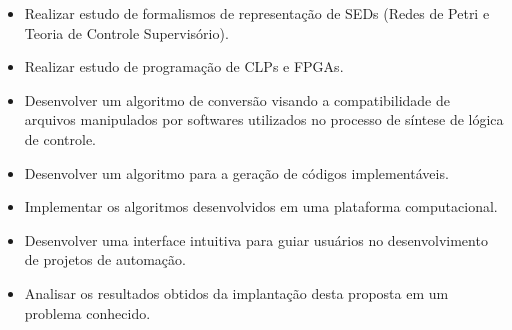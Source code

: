 \begin{itemize}
	\item Realizar estudo de formalismos de representa\c{c}\~ao de SEDs (Redes de Petri e Teoria de Controle Supervis\'orio).
	
	\item Realizar estudo de programa\c{c}\~ao de CLPs e FPGAs.
	
	\item Desenvolver um algoritmo de convers\~ao visando a compatibilidade de arquivos manipulados por softwares utilizados no processo de s\'intese de l\'ogica de controle.
	
	\item Desenvolver um algoritmo para a gera\c{c}\~ao de c\'odigos implement\'aveis.
	
	\item Implementar os algoritmos desenvolvidos em uma plataforma computacional.
	
	\item Desenvolver uma interface intuitiva para guiar usu\'arios no desenvolvimento de projetos de automa\c{c}\~ao.
	
	\item Analisar os resultados obtidos da implanta\c{c}\~ao desta proposta em um problema conhecido.
\end{itemize} 

